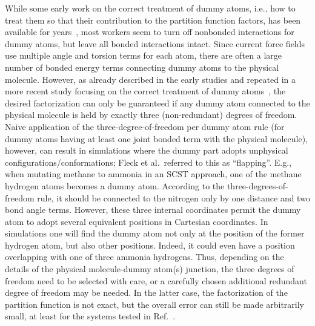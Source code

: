\documentclass[9pt,bestpractices]{livecoms}
\begin{document}
While some early work on the correct treatment of dummy atoms, i.e., how to treat them so that their contribution to the partition function factors, has been available for years~\cite{Boresch_2002,Shobana_2000,Wang_2012}, most workers seem to turn off nonbonded interactions for dummy atoms, but leave all bonded interactions intact. Since current force fields use multiple angle and torsion terms for each atom, there are often a large number of bonded energy terms connecting dummy atoms to the physical molecule. However, as already described in the early studies and repeated in a more recent study focusing on the correct treatment of dummy atoms~\cite{Fleck_2021}, the desired factorization can only be guaranteed if any dummy atom connected to the physical molecule is held by exactly three (non-redundant) degrees of freedom. Naive application of the three-degree-of-freedom per dummy atom rule (for dummy atoms having at least one joint bonded term with the physical molecule), however, can result in simulations where the dummy part adopts unphysical configurations/conformations; Fleck et al.~referred to this as ``flapping''. E.g., when mutating methane to ammonia in an SCST approach, one of the methane hydrogen atoms becomes a dummy atom. According to the three-degrees-of-freedom rule, it should be connected to the nitrogen only by one distance and two bond angle terms. However, these three internal coordinates permit the dummy atom to adopt several equivalent positions in Cartesian coordinates. In simulations one will find the dummy atom not only at the position of the former hydrogen atom, but also other positions. Indeed, it could even have a position overlapping with one of three ammonia hydrogens.   Thus, depending on the details of the physical molecule-dummy atom(s) junction, the three degrees of freedom need to be selected with care, or a carefully chosen additional redundant degree of freedom may be needed. In the latter case, the factorization of the partition function is not exact, but the overall error can still be made arbitrarily small, at least for the systems tested in Ref.~\cite{Fleck_2021}.
\end{document}
